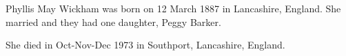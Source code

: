 
Phyllis May Wickham was born on 12 March 1887 in Lancashire, England.
She married  and they had one daughter, Peggy Barker.  

She died in Oct-Nov-Dec 1973 in Southport, Lancashire, England.\cite{PhyllisWickhamDeath}
